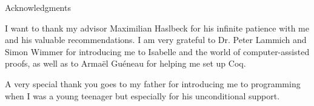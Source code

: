 \thispagestyle{empty}

\vspace*{20mm}

\begin{center}
{ Acknowledgments}
\end{center}

\vspace{10mm}

I want to thank my advisor Maximilian Haslbeck for his infinite patience with me and his valuable recommendations. I am very grateful to Dr. Peter Lammich and Simon Wimmer for introducing me to Isabelle and the world of computer-assisted proofs, as well as to Armaël Guéneau for helping me set up Coq.

A very special thank you goes to my father for introducing me to programming when I was a young teenager but especially for his unconditional support.

\cleardoublepage{}
